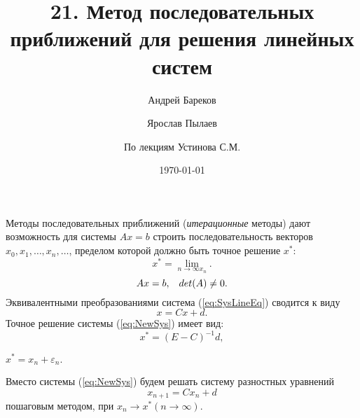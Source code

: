 \documentclass[a4paper,11pt]{article}
\title{21. Метод последовательных приближений для решения линейных систем}
\author{Андрей Бареков \and Ярослав Пылаев \and По лекциям Устинова С.М.}
\date{\today}
\begin{document}
\maketitle
\newpage

\noindent Методы последовательных приближений (\textit{итерационные} методы) дают возможность для системы $Ax=b$ строить последовательность
векторов $x_0, x_1, \dots, x_n, \dots$, пределом которой должно быть точное решение $x^*$: \[x^*=\lim_{n\rightarrow\infty x_n}.\]
\begin{equation}
  Ax = b, \hspace{3mm} det(A) \ne 0.
  \label{eq:SysLineEq}
\end{equation}
Эквивалентными преобразованиями система (\ref{eq:SysLineEq}) сводится к виду
\begin{equation}
  x = Cx+d.
  \label{eq:NewSys}
\end{equation}
Точное решение системы (\ref{eq:NewSys}) имеет вид:
\begin{equation}
  x^* = (E-C)^{-1}d,
  \label{eq:AccurateSole}
\end{equation}
\begin{center}
  $x^* = x_n+\varepsilon_n.$
\end{center}
Вместо системы (\ref{eq:NewSys}) будем решать систему разностных уравнений
\begin{equation}
  x_{n+1} = Cx_n+d
  \label{eq:DiffEq}
\end{equation}
пошаговым методом, при $x_n \rightarrow x^* (n \rightarrow \infty)$.\\
\end{document}
